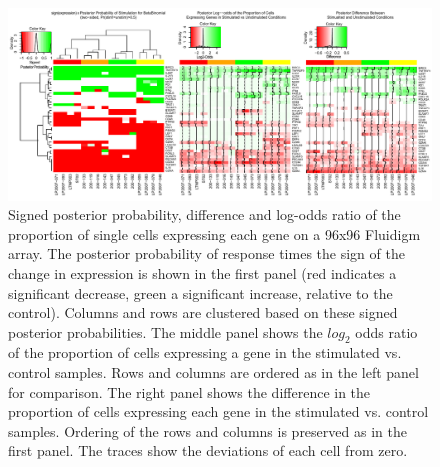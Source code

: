 \documentclass[11pt]{article}
\begin{document}
\begin{figure}[htbp] %
   \centering
   \includegraphics[width=6in]{Figures/FluidigmMIMOSA.pdf} 
\caption{Signed posterior probability, difference and log-odds ratio of the proportion of single cells expressing each gene on a 96x96 Fluidigm array. The posterior probability of response times the sign of the change in expression is shown in the first panel (red indicates a significant decrease, green a significant increase, relative to the control). Columns and rows are clustered based on these signed posterior probabilities. The middle panel shows the $log_2$ odds ratio of the proportion of cells expressing a gene in the stimulated vs. control samples. Rows and columns are ordered as in the left panel for comparison. The right panel shows the difference in the proportion of cells expressing each gene in the stimulated vs. control samples. Ordering of the rows and columns is preserved as in the first panel. The traces show the deviations of each cell from zero.}
\label{fig:fluidigm}
\end{figure}
\end{document}
